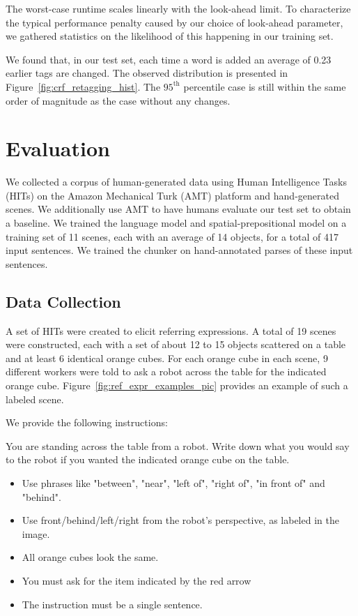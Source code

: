 \documentclass[conference]{IEEEtran}
\numberwithin{equation}{section}
\begin{document}
The worst-case runtime scales linearly with the look-ahead limit. To characterize the typical performance penalty caused by our choice of look-ahead parameter, we gathered statistics on the likelihood of this happening in our training set.

We found that, in our test set, each time a word is added an average of 0.23 earlier tags are changed. The observed distribution is presented in Figure~\ref{fig:crf_retagging_hist}. The $95^\text{th}$ percentile case is still within the same order of magnitude as the case without any changes.


\section{Evaluation} 

We collected a corpus of human-generated data using Human Intelligence Tasks (HITs) on the Amazon Mechanical Turk (AMT) platform and hand-generated scenes. We additionally use AMT to have humans evaluate our test set to obtain a baseline. We trained the language model and spatial-prepositional model on a training set of 11 scenes, each with an average of 14 objects, for a total of 417 input sentences. We trained the chunker on hand-annotated parses of these input sentences.


\subsection{Data Collection}
\label{sec:datacollection}
A set of HITs were created to elicit referring expressions. A total of 19 scenes were constructed, each with a set of about 12 to 15 objects scattered on a table and at least 6 identical orange cubes. For each orange cube in each scene, 9 different workers were told to ask a robot across the table for the indicated orange cube. Figure~\ref{fig:ref_expr_examples_pic} provides an example of such a labeled scene.

We provide the following instructions:

\begin{framed}
You are standing across the table from a robot. Write down what you would say to the robot if you wanted the indicated orange cube on the table.
\begin{itemize}[topsep=0pt,itemsep=-1ex,partopsep=1ex,parsep=1ex,leftmargin=1em]
\item Use phrases like "between", "near", "left of", "right of", "in front of" and "behind".
\item Use front/behind/left/right from the robot's perspective, as labeled in the image. 
\item All orange cubes look the same.
\item You must ask for the item indicated by the red arrow
\item The instruction must be a single sentence.
\end{itemize}
\end{framed}
\end{document}
